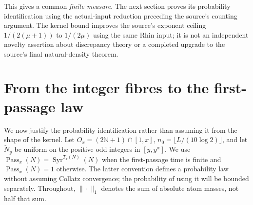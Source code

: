 \documentclass[11pt]{article}
\theoremstyle{remark}\newtheorem{remark}[proposition]{Remark}
\newcommand{\NN}{\mathbb N}
\newcommand{\Syr}{\operatorname{Syr}}
\begin{document}
This gives a common \emph{finite measure}. The next section proves its
probability identification using the actual-input reduction preceding
the source's counting argument.
The kernel bound improves the source's exponent ceiling
$1/(2(\mu+1))$ to $1/(2\mu)$ using the same Rhin input; it is not
an independent novelty assertion about discrepancy theory or a completed
upgrade to the source's final natural-density theorem.

\section{From the integer fibres to the first-passage law}

We now justify the probability identification rather than assuming it from
the shape of the kernel. Let $O_x=(2\NN+1)\cap[1,x]$,
$n_0=\lfloor L/(10\log2)\rfloor$, and let $\widetilde N_y$ be uniform
on the positive odd integers in $[y,y^\alpha]$. We use
$\operatorname{Pass}_x(N)=\Syr^{T_x(N)}(N)$ when the first-passage time
is finite and $\operatorname{Pass}_x(N)=1$ otherwise. The latter convention
defines a probability law without assuming Collatz convergence; the
probability of using it will be bounded separately. Throughout,
$\|\cdot\|_1$ denotes the sum of absolute atom masses, not half that sum.
\end{document}
